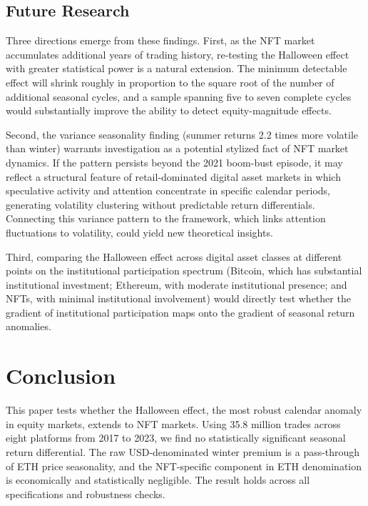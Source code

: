 \documentclass[12pt,a4paper]{article}
\begin{document}
\subsection{Future Research}

Three directions emerge from these findings. First, as the NFT market accumulates additional years of trading history, re-testing the Halloween effect with greater statistical power is a natural extension. The minimum detectable effect will shrink roughly in proportion to the square root of the number of additional seasonal cycles, and a sample spanning five to seven complete cycles would substantially improve the ability to detect equity-magnitude effects.

Second, the variance seasonality finding (summer returns 2.2 times more volatile than winter) warrants investigation as a potential stylized fact of NFT market dynamics. If the pattern persists beyond the 2021 boom-bust episode, it may reflect a structural feature of retail-dominated digital asset markets in which speculative activity and attention concentrate in specific calendar periods, generating volatility clustering without predictable return differentials. Connecting this variance pattern to the \citet{DimpflJank2016} framework, which links attention fluctuations to volatility, could yield new theoretical insights.

Third, comparing the Halloween effect across digital asset classes at different points on the institutional participation spectrum (Bitcoin, which has substantial institutional investment; Ethereum, with moderate institutional presence; and NFTs, with minimal institutional involvement) would directly test whether the gradient of institutional participation maps onto the gradient of seasonal return anomalies.



\section{Conclusion}\label{sec:conclusion}

This paper tests whether the Halloween effect, the most robust calendar anomaly in equity markets, extends to NFT markets. Using 35.8 million trades across eight platforms from 2017 to 2023, we find no statistically significant seasonal return differential. The raw USD-denominated winter premium is a pass-through of ETH price seasonality, and the NFT-specific component in ETH denomination is economically and statistically negligible. The result holds across all specifications and robustness checks.
\end{document}
